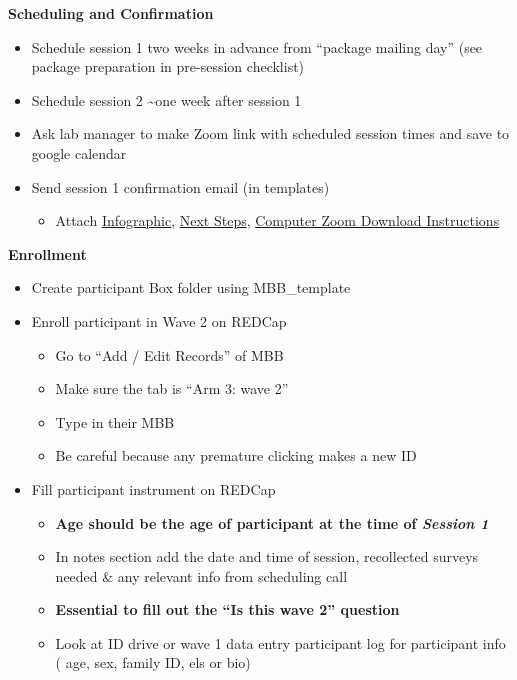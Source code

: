 \documentclass[
]{book}
\providecommand{\tightlist}{%
  \setlength{\itemsep}{0pt}\setlength{\parskip}{0pt}}
\begin{document}
\textbf{Scheduling and Confirmation}

\begin{itemize}
\item
  Schedule session 1 two weeks in advance from ``package mailing day'' (see package preparation in pre-session checklist)
\item
  Schedule session 2 \textasciitilde one week after session 1
\item
  Ask lab manager to make Zoom link with scheduled session times and save to google calendar
\item
  Send session 1 confirmation email (in templates)

  \begin{itemize}
  \tightlist
  \item
    Attach \href{https://app.box.com/file/776654994352}{Infographic}, \href{https://app.box.com/file/774936561660}{Next Steps}, \href{https://ucla.app.box.com/file/680632734387}{Computer Zoom Download Instructions}
  \end{itemize}
\end{itemize}

\textbf{Enrollment}

\begin{itemize}
\tightlist
\item
  Create participant Box folder using MBB\_template\\
\item
  Enroll participant in Wave 2 on REDCap

  \begin{itemize}
  \tightlist
  \item
    Go to ``Add / Edit Records'' of MBB
  \item
    Make sure the tab is ``Arm 3: wave 2''
  \item
    Type in their MBB
  \item
    Be careful because any premature clicking makes a new ID
  \end{itemize}
\item
  Fill participant instrument on REDCap

  \begin{itemize}
  \tightlist
  \item
    \textbf{Age should be the age of participant at the time of \emph{Session 1} }
  \item
    In notes section add the date and time of session, recollected surveys needed \& any relevant info from scheduling call\\
  \item
    \textbf{Essential to fill out the ``Is this wave 2'' question}
  \item
    Look at ID drive or wave 1 data entry participant log for participant info ( age, sex, family ID, els or bio)
  \end{itemize}
\end{itemize}
\end{document}
